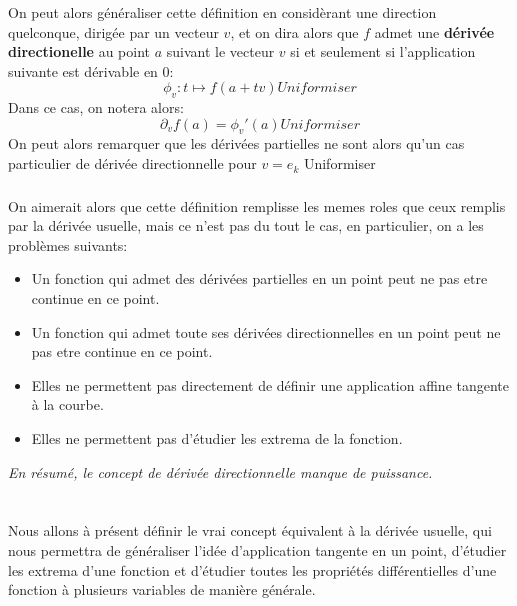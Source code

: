 \subsection*{}
On peut alors généraliser cette définition en considèrant une direction quelconque, dirigée par un vecteur \(v\), et on dira alors que \(f\) admet une \textbf{dérivée directionelle} au point \(a\) suivant le vecteur \(v\) si et seulement si l'application suivante est dérivable en \(0\):
\[
   \phi_v : t \mapsto f(a + tv) Uniformiser
\]
Dans ce cas, on notera alors:
\[
   \partial_v f(a) = \phi_v'(a)   Uniformiser
\]
On peut alors remarquer que les dérivées partielles ne sont alors qu'un cas particulier de dérivée directionnelle pour \(v = e_k\) Uniformiser
\subsection*{}
On aimerait alors que cette définition remplisse les memes roles que ceux remplis par la dérivée usuelle, mais ce n'est pas du tout le cas, en particulier, on a les problèmes suivants:
\begin{itemize}
   \item Un fonction qui admet des dérivées partielles en un point peut ne pas etre continue en ce point.
   \item Un fonction qui admet toute ses dérivées directionnelles en un point peut ne pas etre continue en ce point.
   \item Elles ne permettent pas directement de définir une application affine tangente à la courbe.
   \item Elles ne permettent pas d'étudier les extrema de la fonction.
\end{itemize}
\begin{center}
   \textit{En résumé, le concept de dérivée directionnelle manque de puissance.}
\end{center}

\chapter*{}
Nous allons à présent définir le vrai concept équivalent à la dérivée usuelle, qui nous permettra de généraliser l'idée d'application tangente en un point, d'étudier les extrema d'une fonction et d'étudier toutes les propriétés différentielles d'une fonction à plusieurs variables de manière générale.\<

